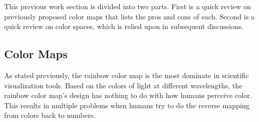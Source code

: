 \documentclass{llncs}
\begin{document}
This previous work section is divided into two parts.  First is a
quick review on previously proposed color maps that lists the pros and
cons of each.  Second is a quick review on color spaces,
which is relied upon in subsequent discussions.

\subsection{Color Maps}
\label{sec:PreviousWork:ColorMaps}

As stated previously, the rainbow color map is the most dominate in
scientific visualization tools.  Based on the colors of light at different
wavelengths, the rainbow color map's design has nothing to do with how
humans perceive color.  This results in multiple problems when humans try
to do the reverse mapping from colors back to numbers.
\end{document}
